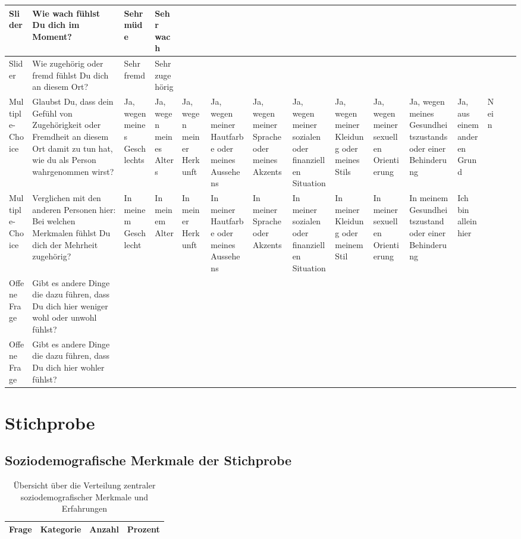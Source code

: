\begin{appendices}
\begin{landscape}
\begin{longtable}{p{1.2cm} p{3.8cm} *{13}{p{1cm}}}
\midrule
Slider & Wie wach fühlst Du dich im Moment? & Sehr müde & Sehr wach &  &  &  &  &  &  &  &  &  &  & \\
\midrule
Slider & Wie zugehörig oder fremd fühlst Du dich an diesem Ort? & Sehr fremd & Sehr zugehörig &  &  &  &  &  &  &  &  &  &  & \\
\midrule
Multiple-Choice & Glaubst Du, dass dein Gefühl von Zugehörigkeit oder Fremdheit an diesem Ort damit zu tun hat, wie du als Person wahrgenommen wirst? & Ja, wegen meines Geschlechts & Ja, wegen meines Alters & Ja, wegen meiner Herkunft & Ja, wegen meiner Hautfarbe oder meines Aussehens & Ja, wegen meiner Sprache oder meines Akzents & Ja, wegen meiner sozialen oder finanziellen Situation & Ja, wegen meiner Kleidung oder meines Stils & Ja, wegen meiner sexuellen Orientierung & Ja, wegen meines Gesundheitszustands oder einer Behinderung & Ja, aus einem anderen Grund & Nein &  & \\
\midrule
Multiple-Choice & Verglichen mit den anderen Personen hier: Bei welchen Merkmalen fühlst Du dich der Mehrheit zugehörig? & In meinem Geschlecht & In meinem Alter & In meiner Herkunft & In meiner Hautfarbe oder meines Aussehens & In meiner Sprache oder Akzents & In meiner sozialen oder finanziellen Situation & In meiner Kleidung oder meinem Stil & In meiner sexuellen Orientierung & In meinem Gesundheitszustand oder einer Behinderung & Ich bin allein hier &  &  & \\
\midrule
Offene Frage & Gibt es andere Dinge die dazu führen, dass Du dich hier weniger wohl oder unwohl fühlst? &  &  &  &  &  &  &  &  &  &  &  &  & \\
\midrule
Offene Frage & Gibt es andere Dinge die dazu führen, dass Du dich hier wohler fühlst? &  &  &  &  &  &  &  &  &  &  &  &  & \\
\bottomrule
\end{longtable}
    
\end{landscape}




\chapter{Stichprobe}
\section{Soziodemografische Merkmale der Stichprobe}
\label{app:appendix_demographics}

\begin{longtable}{p{5.5cm}p{5.5cm}rr}
    \caption{Übersicht über die Verteilung zentraler soziodemografischer Merkmale und Erfahrungen}
    \label{tab:soziodemografie_gesamt}\\
    \toprule
    Frage & Kategorie & Anzahl & Prozent \\
    \midrule
    \endfirsthead


\end{longtable}
\end{appendices}
